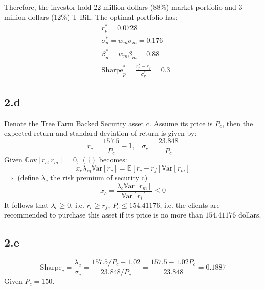 \documentclass[10 pt]{hwtemplate} %
\begin{document}
Therefore, the investor hold 22 million dollars (88\%) market portfolio and 3 million dollars (12\%) T-Bill. The optimal portfolio has:
\begin{equation}
  \begin{split}
    &r_p^* = 0.0728 \\
    &\sigma_p^* = w_m \sigma_m = 0.176 \\
    &\beta_p^* = w_m \beta_m = 0.88 \\
    &\text{Sharpe}_p^* = \frac{r_p^* - r_f}{\sigma_p^*} = 0.3
  \end{split}
\end{equation}

\subsection*{2.d} Denote the Tree Farm Backed Security asset c. Assume its price is $P_c$, then the expected return and standard deviation of return is given by:
$$
r_c = \frac{157.5}{P_c} - 1,~~~~\sigma_c = \frac{23.848}{P_c}
$$
Given $\mathrm{\mathbb{C}ov}\left[r_c, r_m\right] = 0$, $(\dag)$ becomes:
\begin{equation}
  x_c\lambda_m \mathrm{\mathbb{V}ar}\left[r_c\right]=\mathbb{E}\left[r_c - r_f\right]\mathrm{\mathbb{V}ar}\left[r_m\right]
\end{equation}
$\Rightarrow$ (define $\lambda_c$ the risk premium of security c)
\begin{equation}
  x_c = \frac{\lambda_c \mathrm{\mathbb{V}ar}\left[r_m\right]}{\mathrm{\mathbb{V}ar}\left[r_i\right]} \leq  0
\end{equation}
It follows that $\lambda_c \geq 0$, i.e. $r_c \geq r_f$, $P_c \leq 154.41176$, i.e. the clients are recommended to purchase this asset if its price is no more than $154.41176$ dollars.

\subsection*{2.e} 
\begin{equation}
  \text{Sharpe}_c = \frac{\lambda_c}{\sigma_c} = \frac{157.5/P_c - 1.02}{23.848/P_c} = \frac{157.5 - 1.02P_c}{23.848} = 0.1887
\end{equation}
Given $P_c = 150$.
\end{document}
